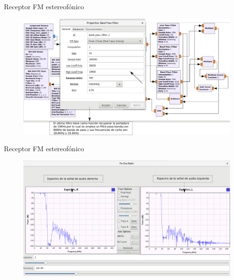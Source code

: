 \begin{frame}{Receptor FM estereofónico}

\begin{figure}[H]
\centering
\vspace{-3mm}
\includegraphics[width=\textwidth]{parte3/lab9/pdf/lab9_4.pdf}
\end{figure}

\end{frame}

\begin{frame}{Receptor FM estereofónico}

\begin{figure}[H]
\centering
\vspace{-3mm}
\includegraphics[width=\textwidth]{parte3/lab9/pdf/lab9_5.pdf}
\end{figure}

\end{frame}
